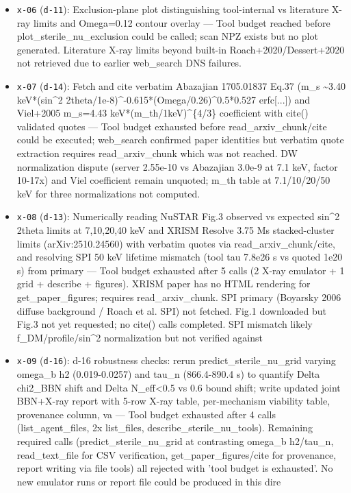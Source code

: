 \documentclass[11pt,a4paper]{article}
\begin{document}
\begin{itemize}
  \item \texttt{x-06} (\texttt{d-11}): Exclusion-plane plot distinguishing tool-internal vs literature X-ray limits and Omega=0.12 contour overlay --- Tool budget reached before plot\_sterile\_nu\_exclusion could be called; scan NPZ exists but no plot generated. Literature X-ray limits beyond built-in Roach+2020/Dessert+2020 not retrieved due to earlier web\_search DNS failures.
  \item \texttt{x-07} (\texttt{d-14}): Fetch and cite verbatim Abazajian 1705.01837 Eq.37 (m\_s \textasciitilde{}3.40 keV*(sin\textasciicircum{}2 2theta/1e-8)\textasciicircum{}-0.615*(Omega/0.26)\textasciicircum{}0.5*0.527 erfc[...]) and Viel+2005 m\_s=4.43 keV*(m\_th/1keV)\textasciicircum{}\{4/3\} coefficient with cite() validated quotes --- Tool budget exhausted before read\_arxiv\_chunk/cite could be executed; web\_search confirmed paper identities but verbatim quote extraction requires read\_arxiv\_chunk which was not reached. DW normalization dispute (server 2.55e-10 vs Abazajian 3.0e-9 at 7.1 keV, factor 10-17x) and Viel coefficient remain unquoted; m\_th table at 7.1/10/20/50 keV for three normalizations not computed.
  \item \texttt{x-08} (\texttt{d-13}): Numerically reading NuSTAR Fig.3 observed vs expected sin\textasciicircum{}2 2theta limits at 7,10,20,40 keV and XRISM Resolve 3.75 Ms stacked-cluster limits (arXiv:2510.24560) with verbatim quotes via read\_arxiv\_chunk/cite, and resolving SPI 50 keV lifetime mismatch (tool tau 7.8e26 s vs quoted 1e20 s) from primary --- Tool budget exhausted after 5 calls (2 X-ray emulator + 1 grid + describe + figures). XRISM paper has no HTML rendering for get\_paper\_figures; requires read\_arxiv\_chunk. SPI primary (Boyarsky 2006 diffuse background / Roach et al. SPI) not fetched. Fig.1 downloaded but Fig.3 not yet requested; no cite() calls completed. SPI mismatch likely f\_DM/profile/sin\textasciicircum{}2 normalization but not verified against 
  \item \texttt{x-09} (\texttt{d-16}): d-16 robustness checks: rerun predict\_sterile\_nu\_grid varying omega\_b h2 (0.019-0.0257) and tau\_n (866.4-890.4 s) to quantify Delta chi2\_BBN shift and Delta N\_eff\textless{}0.5 vs 0.6 bound shift; write updated joint BBN+X-ray report with 5-row X-ray table, per-mechanism viability table, provenance column, va --- Tool budget exhausted after 4 calls (list\_agent\_files, 2x list\_files, describe\_sterile\_nu\_tools). Remaining required calls (predict\_sterile\_nu\_grid at contrasting omega\_b h2/tau\_n, read\_text\_file for CSV verification, get\_paper\_figures/cite for provenance, report writing via file tools) all rejected with 'tool budget is exhausted'. No new emulator runs or report file could be produced in this dire

\end{itemize}
\end{document}
